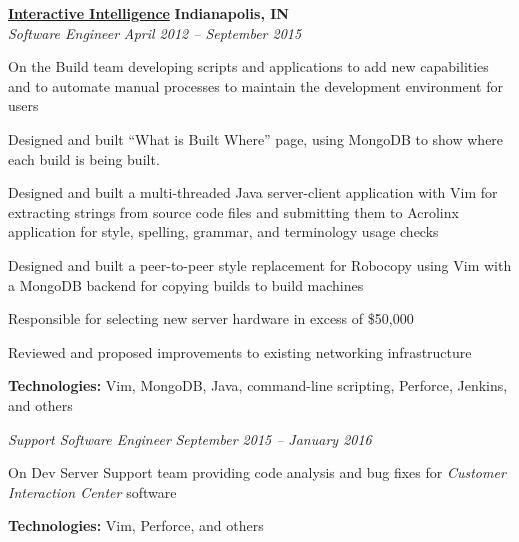 %
    \headerrow
        {\textbf{\href{https://www.genesys.com/inin}{Interactive Intelligence}}}
        {\textbf{Indianapolis, IN}}
    \\
    \headerrow
        {\emph{Software Engineer}}
        {\emph{April 2012 -- September 2015}}
    \begin{itemize*}
        \item On the Build team developing scripts and applications to add new capabilities and to
                automate manual processes to maintain the development environment for users
        \item Designed and built ``What is Built Where'' page, using MongoDB to show where each build is being built.
         \item Designed and built a multi-threaded Java server-client application with Vim for extracting strings from
                source code files and submitting them to Acrolinx application for style, spelling, grammar, and terminology
                usage checks
        \item Designed and built a peer-to-peer style replacement for Robocopy using Vim with a MongoDB backend
                for copying builds to build machines
        \item Responsible for selecting new server hardware in excess of \$50,000
        \item Reviewed and proposed improvements to existing networking infrastructure
    \end{itemize*}

    \hspace{1.0em}
    \textbf{Technologies:} Vim, MongoDB, Java, command-line scripting, Perforce, Jenkins, and others
    \vspace{0.3em}

    \headerrow
        {\emph{Support Software Engineer}}
        {\emph{September 2015 -- January 2016}}
    \begin{itemize*}
        \item On Dev Server Support team providing code analysis and bug fixes for \emph{Customer Interaction Center} software
    \end{itemize*}

    \hspace{1.0em}
    \textbf{Technologies:} Vim, Perforce, and others
